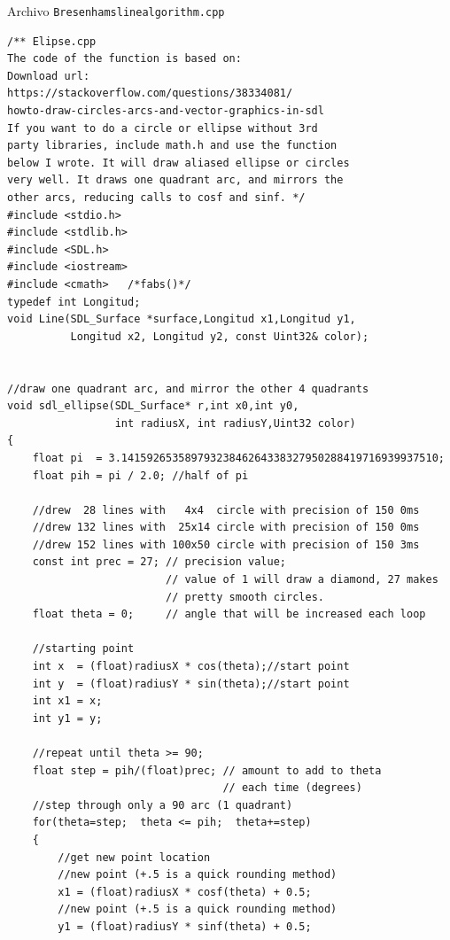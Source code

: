 \documentclass[11pt]{article}
\begin{document}
\begin{center}
Archivo {\tt Bresenhamslinealgorithm.cpp}
\end{center}
\begin{verbatim}
/** Elipse.cpp
The code of the function is based on:
Download url:
https://stackoverflow.com/questions/38334081/
howto-draw-circles-arcs-and-vector-graphics-in-sdl
If you want to do a circle or ellipse without 3rd 
party libraries, include math.h and use the function 
below I wrote. It will draw aliased ellipse or circles 
very well. It draws one quadrant arc, and mirrors the 
other arcs, reducing calls to cosf and sinf. */
#include <stdio.h>
#include <stdlib.h>
#include <SDL.h>
#include <iostream>
#include <cmath>   /*fabs()*/
typedef int Longitud;
void Line(SDL_Surface *surface,Longitud x1,Longitud y1, 
          Longitud x2, Longitud y2, const Uint32& color);


//draw one quadrant arc, and mirror the other 4 quadrants
void sdl_ellipse(SDL_Surface* r,int x0,int y0,
                 int radiusX, int radiusY,Uint32 color)
{
    float pi  = 3.14159265358979323846264338327950288419716939937510;
    float pih = pi / 2.0; //half of pi

    //drew  28 lines with   4x4  circle with precision of 150 0ms
    //drew 132 lines with  25x14 circle with precision of 150 0ms
    //drew 152 lines with 100x50 circle with precision of 150 3ms
    const int prec = 27; // precision value; 
                         // value of 1 will draw a diamond, 27 makes 
                         // pretty smooth circles.
    float theta = 0;     // angle that will be increased each loop

    //starting point
    int x  = (float)radiusX * cos(theta);//start point
    int y  = (float)radiusY * sin(theta);//start point
    int x1 = x;
    int y1 = y;

    //repeat until theta >= 90;
    float step = pih/(float)prec; // amount to add to theta 
                                  // each time (degrees)
    //step through only a 90 arc (1 quadrant)
    for(theta=step;  theta <= pih;  theta+=step)
    {
        //get new point location
        //new point (+.5 is a quick rounding method)
        x1 = (float)radiusX * cosf(theta) + 0.5; 
        //new point (+.5 is a quick rounding method)
        y1 = (float)radiusY * sinf(theta) + 0.5; 


\end{verbatim}
\end{document}
